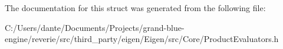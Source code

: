 The documentation for this struct was generated from the following file\+:\begin{DoxyCompactItemize}
\item 
C\+:/\+Users/dante/\+Documents/\+Projects/grand-\/blue-\/engine/reverie/src/third\+\_\+party/eigen/\+Eigen/src/\+Core/Product\+Evaluators.\+h\end{DoxyCompactItemize}
